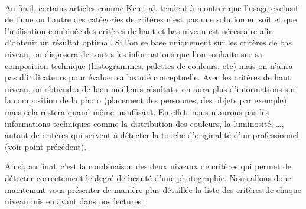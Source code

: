 \documentclass[11pt, french,screen]{report-rd-info}
\begin{document}
\paragraph*{}
Au final, certains articles comme Ke et al. tendent à montrer que l'usage exclusif de l'une ou l'autre des catégories de critères n’est pas une solution en soit et que l’utilisation combinée des critères de haut et bas niveau est nécessaire afin d’obtenir un résultat optimal. Si l’on se base uniquement sur les critères de bas niveau, on disposera de toutes les informations que l’on souhaite sur sa composition technique (histogrammes, palettes de couleurs, etc) mais on n’aura pas d’indicateurs pour évaluer sa beauté conceptuelle. Avec les critères de haut niveau, on obtiendra de bien meilleurs résultats, on aura plus d’informations sur la composition de la photo (placement des personnes, des objets par exemple) mais cela restera quand même insuffisant. En effet, nous n’aurons pas les informations techniques comme la distribution des couleurs, la luminosité, \ldots, autant de critères qui servent à détecter la touche d’originalité d’un professionnel (voir point précédent).

Ainsi, au final, c’est la combinaison des deux niveaux de critères qui permet de détecter correctement le degré de beauté d’une photographie.
Nous allons donc maintenant vous présenter de manière plus détaillée la liste des critères de chaque niveau mis en avant dans nos lectures :
\end{document}
